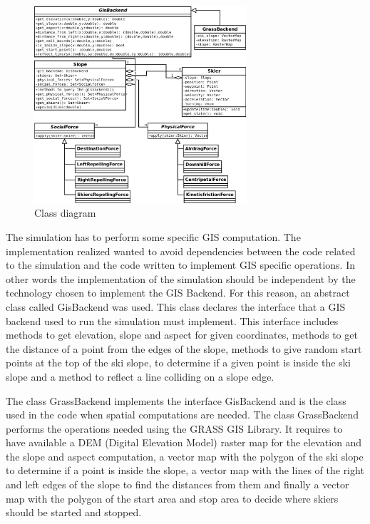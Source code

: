 \documentclass[12pt,a4paper,twoside]{book}
\begin{document}
\begin{figure}
  \begin{center}
    \includegraphics[width=0.7\textwidth]{images/Class_diagram.eps}
    \caption{Class diagram}\label{class_diagram}
  \end{center}
\end{figure}

The simulation has to perform some specific GIS computation. The implementation realized wanted to avoid dependencies between the code related to the simulation and the code written to implement GIS specific operations. In other words the implementation of the simulation should be independent by the technology chosen to implement the GIS Backend. For this reason, an abstract class called GisBackend was used. This class declares the interface that a GIS backend used to run the simulation must implement. This interface includes methods to get elevation, slope and aspect for given coordinates, methods to get the distance of a point from the edges of the slope, methods to give random start points at the top of the ski slope, to determine if a given point is inside the ski slope and a method to reflect a line colliding on a slope edge.

The class GrassBackend implements the interface GisBackend and is the class used in the code when spatial computations are needed. The class GrassBackend performs the operations needed using the GRASS GIS Library. It requires to have available a DEM (Digital Elevation Model) raster map for the elevation and the slope and aspect computation, a vector map with the polygon of the ski slope to determine if a point is inside the slope, a vector map with the lines of the right and left edges of the slope to find the distances from them and finally a vector map with the polygon of the start area and stop area to decide where skiers should be started and stopped.
\end{document}
